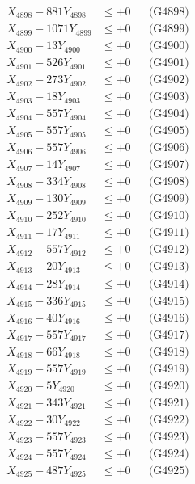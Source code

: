 \documentclass[a4paper,10pt]{article}
\begin{document}
{\begin{align}
X_{4898} - 881Y_{4898} &\leq +0 && \text{(G4898)} \\
X_{4899} - 1071Y_{4899} &\leq +0 && \text{(G4899)} \\
X_{4900} - 13Y_{4900} &\leq +0 && \text{(G4900)} \\
\allowbreak
X_{4901} - 526Y_{4901} &\leq +0 && \text{(G4901)} \\
X_{4902} - 273Y_{4902} &\leq +0 && \text{(G4902)} \\
X_{4903} - 18Y_{4903} &\leq +0 && \text{(G4903)} \\
X_{4904} - 557Y_{4904} &\leq +0 && \text{(G4904)} \\
X_{4905} - 557Y_{4905} &\leq +0 && \text{(G4905)} \\
X_{4906} - 557Y_{4906} &\leq +0 && \text{(G4906)} \\
X_{4907} - 14Y_{4907} &\leq +0 && \text{(G4907)} \\
X_{4908} - 334Y_{4908} &\leq +0 && \text{(G4908)} \\
X_{4909} - 130Y_{4909} &\leq +0 && \text{(G4909)} \\
X_{4910} - 252Y_{4910} &\leq +0 && \text{(G4910)} \\
\allowbreak
X_{4911} - 17Y_{4911} &\leq +0 && \text{(G4911)} \\
X_{4912} - 557Y_{4912} &\leq +0 && \text{(G4912)} \\
X_{4913} - 20Y_{4913} &\leq +0 && \text{(G4913)} \\
X_{4914} - 28Y_{4914} &\leq +0 && \text{(G4914)} \\
X_{4915} - 336Y_{4915} &\leq +0 && \text{(G4915)} \\
X_{4916} - 40Y_{4916} &\leq +0 && \text{(G4916)} \\
X_{4917} - 557Y_{4917} &\leq +0 && \text{(G4917)} \\
X_{4918} - 66Y_{4918} &\leq +0 && \text{(G4918)} \\
X_{4919} - 557Y_{4919} &\leq +0 && \text{(G4919)} \\
X_{4920} - 5Y_{4920} &\leq +0 && \text{(G4920)} \\
\allowbreak
X_{4921} - 343Y_{4921} &\leq +0 && \text{(G4921)} \\
X_{4922} - 30Y_{4922} &\leq +0 && \text{(G4922)} \\
X_{4923} - 557Y_{4923} &\leq +0 && \text{(G4923)} \\
X_{4924} - 557Y_{4924} &\leq +0 && \text{(G4924)} \\
X_{4925} - 487Y_{4925} &\leq +0 && \text{(G4925)} \\

\end{align}}
\end{document}
